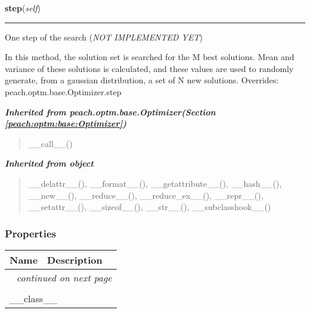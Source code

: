 \hspace{.8\funcindent}\begin{boxedminipage}{\funcwidth}

    \raggedright \textbf{step}(\textit{self})

    \vspace{-1.5ex}

    \rule{\textwidth}{0.5\fboxrule}
\setlength{\parskip}{2ex}

One step of the search (\emph{NOT IMPLEMENTED YET})

In this method, the solution set is searched for the M best solutions.
Mean and variance of these solutions is calculated, and these values are
used to randomly generate, from a gaussian distribution, a set of N new
solutions.
\setlength{\parskip}{1ex}
      Overrides: peach.optm.base.Optimizer.step

    \end{boxedminipage}


\large{\textbf{\textit{Inherited from peach.optm.base.Optimizer\textit{(Section \ref{peach:optm:base:Optimizer})}}}}

\begin{quote}
\_\_call\_\_()
\end{quote}

\large{\textbf{\textit{Inherited from object}}}

\begin{quote}
\_\_delattr\_\_(), \_\_format\_\_(), \_\_getattribute\_\_(), \_\_hash\_\_(), \_\_new\_\_(), \_\_reduce\_\_(), \_\_reduce\_ex\_\_(), \_\_repr\_\_(), \_\_setattr\_\_(), \_\_sizeof\_\_(), \_\_str\_\_(), \_\_subclasshook\_\_()
\end{quote}


  \subsubsection{Properties}

    \vspace{-1cm}
\hspace{\varindent}\begin{longtable}{|p{\varnamewidth}|p{\vardescrwidth}|l}
\cline{1-2}
\cline{1-2} \centering \textbf{Name} & \centering \textbf{Description}& \\
\cline{1-2}
\endhead\cline{1-2}\multicolumn{3}{r}{\small\textit{continued on next page}}\\\endfoot\cline{1-2}
\endlastfoot\multicolumn{2}{|l|}{\textit{Inherited from object}}\\
\multicolumn{2}{|p{\varwidth}|}{\raggedright \_\_class\_\_}\\
\cline{1-2}
\end{longtable}

